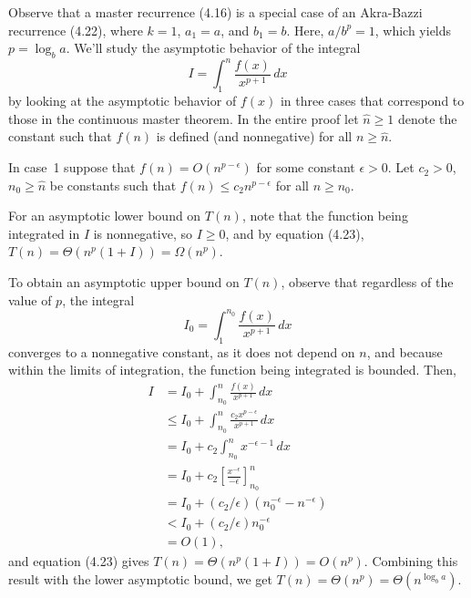 \starred
{}
Observe that a master recurrence (4.16) is a special case of an Akra-Bazzi recurrence (4.22), where $k=1$, $a_1=a$, and $b_1=b$.
Here, $a/b^p=1$, which yields $p=\log_ba$.
We'll study the asymptotic behavior of the integral
\[
    I = \int_1^n\frac{f(x)}{x^{p+1}}\,dx
\]
by looking at the asymptotic behavior of $f(x)$ in three cases that correspond to those in the continuous master theorem.
In the entire proof let $\widehat{n}\ge1$ denote the constant such that $f(n)$ is defined (and nonnegative) for all $n\ge\widehat{n}$.

In case~1 suppose that $f(n)=O(n^{p-\epsilon})$ for some constant $\epsilon>0$.
Let $c_2>0$, $n_0\ge\widehat{n}$ be constants such that $f(n)\le c_2n^{p-\epsilon}$ for all $n\ge n_0$.

For an asymptotic lower bound on $T(n)$, note that the function being integrated in $I$ is nonnegative, so $I\ge0$, and by equation (4.23), $T(n)=\Theta(n^p(1+I))=\Omega(n^p)$.

To obtain an asymptotic upper bound on $T(n)$, observe that regardless of the value of $p$, the integral
\[
    I_0 = \int_1^{n_0}\frac{f(x)}{x^{p+1}}\,dx
\]
converges to a nonnegative constant, as it does not depend on $n$, and because within the limits of integration, the function being integrated is bounded.
Then,
\begin{align*}
    I &= I_0+\int_{n_0}^n\frac{f(x)}{x^{p+1}}\,dx \\[1mm]
    &\le I_0+\int_{n_0}^n\frac{c_2x^{p-\epsilon}}{x^{p+1}}\,dx \\[1mm]
    &= I_0+c_2\int_{n_0}^nx^{-\epsilon-1}\,dx \\[1mm]
    &= I_0+c_2\left[\frac{x^{-\epsilon}}{-\epsilon}\right]_{n_0}^n \\[1mm]
    &= I_0+(c_2/\epsilon)(n_0^{-\epsilon}-n^{-\epsilon}) \\
    &< I_0+(c_2/\epsilon)n_0^{-\epsilon} \\
    &= O(1),
\end{align*}
and equation (4.23) gives $T(n)=\Theta(n^p(1+I))=O(n^p)$.
Combining this result with the lower asymptotic bound, we get $T(n)=\Theta(n^p)=\Theta(n^{\log_ba})$.


